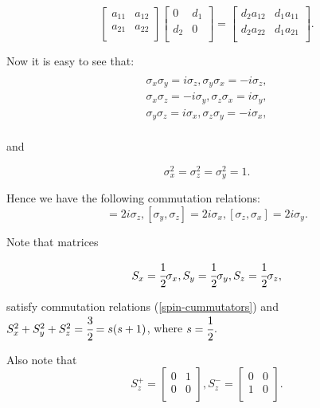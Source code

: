 \documentclass[main.tex]{subfiles}
\begin{document}
\begin{equation}
\begin{bmatrix}
    a_{11} &  a_{12} \\
    a_{21} & a_{22} \\
\end{bmatrix}
\begin{bmatrix}
    0 & d_1 \\
    d_2 & 0 \\
\end{bmatrix}
= \begin{bmatrix}
    d_2 a_{12} &  d_1 a_{11} \\
    d_2 a_{22} & d_1 a_{21} \\
\end{bmatrix}.
\end{equation}


Now it is easy to see that:
\begin{multline}\\
\sigma_x \sigma_y = i\sigma_z, \sigma_y\sigma_x = -i\sigma_z,\\
\sigma_x \sigma_z = -i\sigma_y, \sigma_z\sigma_x = i\sigma_y,\\
\sigma_y \sigma_z = i\sigma_x, \sigma_z\sigma_y = -i\sigma_x,\\
\end{multline}

and

\begin{equation}
\sigma_x^2 = \sigma_z^2 = \sigma_y^2 = 1.
\end{equation}

Hence we have the following commutation relations:
\begin{equation}
[\sigma_x, \sigma_y] = 2i\sigma_z, [\sigma_y, \sigma_z] = 2i\sigma_x, [\sigma_z, \sigma_x] = 2i\sigma_y.
\end{equation}

Note that matrices

\begin{equation}
S_x = \cfrac{1}{2}\sigma_x, S_y = \cfrac{1}{2}\sigma_y, S_z = \cfrac{1}{2}\sigma_z,
\end{equation}

satisfy commutation relations (\ref{spin-cummutators}) and $S^2_x + S^2_y + S^2_z = \cfrac{3}{2} = s(s + 1)$, where $s=\cfrac{1}{2}$.


Also note that
\begin{equation}
S^{+}_z = \begin{bmatrix}
    0 &  1 \\
    0 & 0 \\
\end{bmatrix},
S^{-}_z = \begin{bmatrix}
    0 &  0 \\
    1 & 0 \\
\end{bmatrix}.
\end{equation}
\end{document}
